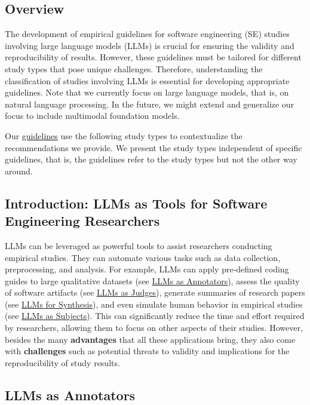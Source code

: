 



\subsection{Overview}

The development of empirical guidelines for software engineering (SE) studies involving large language models (LLMs) is crucial for ensuring the validity and reproducibility of results.
However, these guidelines must be tailored for different study types that pose unique challenges.
Therefore, understanding the classification of studies involving LLMs is essential for developing appropriate guidelines.
Note that we currently focus on large language models, that is, on natural language processing.
In the future, we might extend and generalize our focus to include multimodal foundation models.

Our \href{/guidelines/}{guidelines} use the following study types to contextualize the recommendations we provide.
We present the study types independent of specific guidelines, that is, the guidelines refer to the study types but not the other way around.

\subsection{Introduction: LLMs as Tools for Software Engineering Researchers}

LLMs can be leveraged as powerful tools to assist researchers conducting empirical studies.
They can automate various tasks such as data collection, preprocessing, and analysis.
For example, LLMs can apply pre-defined coding guides to large qualitative datasets (see \href{/study-types/#llms-as-annotators}{LLMs as Annotators}), assess the quality of software artifacts (see \href{/study-types/#llms-as-judges}{LLMs as Judges}), generate summaries of research papers (see \href{/study-types/#llms-for-synthesis}{LLMs for Synthesis}), and even simulate human behavior in empirical studies (see \href{/study-types/#llms-as-subjects}{LLMs as Subjects}).
This can significantly reduce the time and effort required by researchers, allowing them to focus on other aspects of their studies.
However, besides the many \textbf{advantages} that all these applications bring, they also come with \textbf{challenges} such as potential threats to validity and implications for the reproducibility of study results.


\subsection{LLMs as Annotators}


